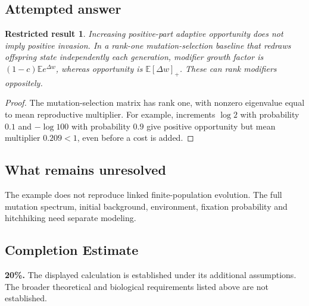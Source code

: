 \documentclass[11pt]{article}
\newcommand{\E}{\mathbb E}
\providecommand{\E}{\mathbb E}
\newtheorem{attemptresult}{Restricted result}[section]
\begin{document}
\subsection{Attempted answer}
\begin{attemptresult}
Increasing positive-part adaptive opportunity does not imply positive invasion. In a rank-one mutation-selection baseline that redraws offspring state independently each generation, modifier growth factor is $(1-c)\E e^{\Delta w}$, whereas opportunity is $\E[\Delta w]_+$. These can rank modifiers oppositely.
\end{attemptresult}
\begin{proof}
The mutation-selection matrix has rank one, with nonzero eigenvalue equal to mean reproductive multiplier. For example, increments $\log2$ with probability $0.1$ and $-\log100$ with probability $0.9$ give positive opportunity but mean multiplier $0.209<1$, even before a cost is added.
\end{proof}
\subsection{What remains unresolved}
The example does not reproduce linked finite-population evolution. The full mutation spectrum, initial background, environment, fixation probability and hitchhiking need separate modeling.
\subsection{Completion Estimate}
\textbf{20\%.} The displayed calculation is established under its additional assumptions. The broader theoretical and biological requirements listed above are not established.
\end{document}
